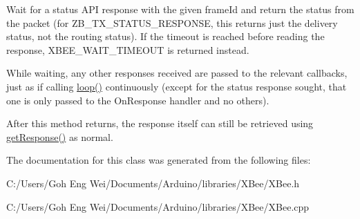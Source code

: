 Wait for a status A\+PI response with the given frame\+Id and return the status from the packet (for Z\+B\+\_\+\+T\+X\+\_\+\+S\+T\+A\+T\+U\+S\+\_\+\+R\+E\+S\+P\+O\+N\+SE, this returns just the delivery status, not the routing status). If the timeout is reached before reading the response, X\+B\+E\+E\+\_\+\+W\+A\+I\+T\+\_\+\+T\+I\+M\+E\+O\+UT is returned instead.

While waiting, any other responses received are passed to the relevant callbacks, just as if calling \hyperlink{class_x_bee_with_callbacks_aec6a4688f09fef714c377ede587b5ba9}{loop()} continuously (except for the status response sought, that one is only passed to the On\+Response handler and no others).

After this method returns, the response itself can still be retrieved using \hyperlink{class_x_bee_a18250def80e8b643aa1ccc15a98937f3}{get\+Response()} as normal. 

The documentation for this class was generated from the following files\+:\begin{DoxyCompactItemize}
\item 
C\+:/\+Users/\+Goh Eng Wei/\+Documents/\+Arduino/libraries/\+X\+Bee/X\+Bee.\+h\item 
C\+:/\+Users/\+Goh Eng Wei/\+Documents/\+Arduino/libraries/\+X\+Bee/X\+Bee.\+cpp\end{DoxyCompactItemize}
